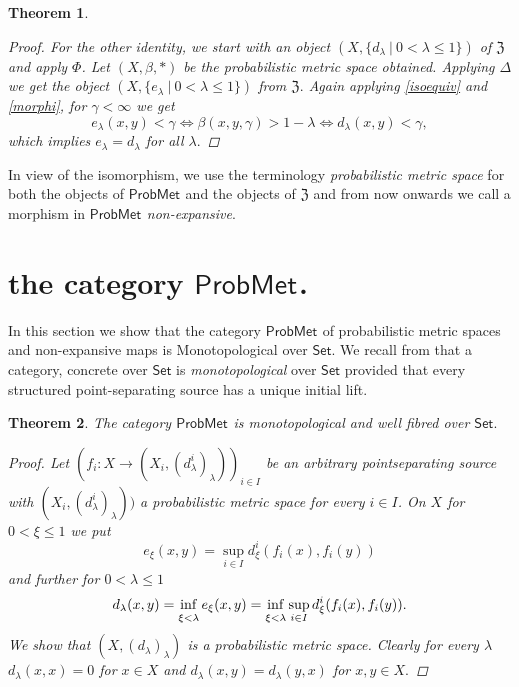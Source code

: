 \documentclass[12pt,a4paper]{amsart}
\theoremstyle{theorem}
\newtheorem{theorem}{Theorem}[section]
\theoremstyle{definition}
\newcommand{\zz}{\ensuremath{\mathfrak{Z}}}
\newcommand{\PM}{\ensuremath{\mathsf{ProbMet_{}}}}
\renewcommand{\inf}{\myinf}
\DeclareMathOperator*{\myinf}{in\vphantom{p}f}
\renewcommand{\b}{\ensuremath{\beta}}
\renewcommand{\l}{\ensuremath{\lambda}}
\def\rw{\rightarrow}
\begin{document}
{\begin{theorem}
\begin{proof}
For the other identity, we start with an object  $(X, \{d_\l \ | \ 0 <\l \leq 1 \})$ of $\zz$ and apply $\Phi$. Let $(X, \b, *)$ be the probabilistic metric space obtained. Applying $\Delta$ we get the object $(X, \{e_\l \ | \ 0 <\l \leq 1 \})$ from $\zz.$
Again applying \eqref{isoequiv} and \eqref{morphi}, for $\gamma < \infty$ we get
$$
e_\l(x,y) < \gamma \Leftrightarrow \b(x,y, \gamma) > 1 - \l \Leftrightarrow d_\l (x,y)  < \gamma,
$$
which implies $e_\l = d_\l$ for all $\l.$
\end{proof}

\end{theorem}

In view of the isomorphism, we use the terminology \emph{probabilistic metric space} for both the objects of $\PM$ and the objects of $\mathfrak{Z}$ and  from now onwards we call a morphism in $\PM$  \emph {non-expansive}.

\section{the category $\PM$.}



In this section we  show that the category $\PM$ of probabilistic metric spaces and non-expansive maps is Monotopological over $\mathsf{Set}.$ 
We recall from \cite{AHS} that a category, concrete over $\mathsf{Set}$ is \emph{monotopological }over $\mathsf{Set}$ provided that every structured point-separating source has a unique initial lift. 

\begin{theorem}\label{mono}
The category $\PM$ is monotopological and well fibred over $\mathsf{Set}.$
\begin{proof}
Let $(f_i: X \rw (X_i, (d^i_\l)_\l))_{i \in I}$ be an arbitrary pointseparating source with $(X_i, (d^i_\l)_\l))$ a probabilistic metric space for every $i \in I$.
On $X$ for $0< \xi \leq 1$ we put 
\begin{equation}\label{sup}
e_\xi (x,y)= \sup _{i \in I} d^i_\xi (f_i(x), f_i(y))
\end{equation}
and further for $0< \l \leq 1$
\begin{equation}\label{inf}
d_\l(x,y) = \inf_{\xi < \l} e_\xi(x,y) =  \inf_{\xi < \l} \sup _{i \in I} d^i_\xi (f_i(x), f_i(y)).
\end{equation}
We show that $(X,(d_\l)_\l)$ is a probabilistic metric space.
Clearly for every $\l$ $d_\l(x,x) = 0$ for $x \in X$ and $d_\l(x,y) = d_\l(y,x)$ for $x,y \in X.$


\end{proof}
\end{theorem}}
\end{document}
